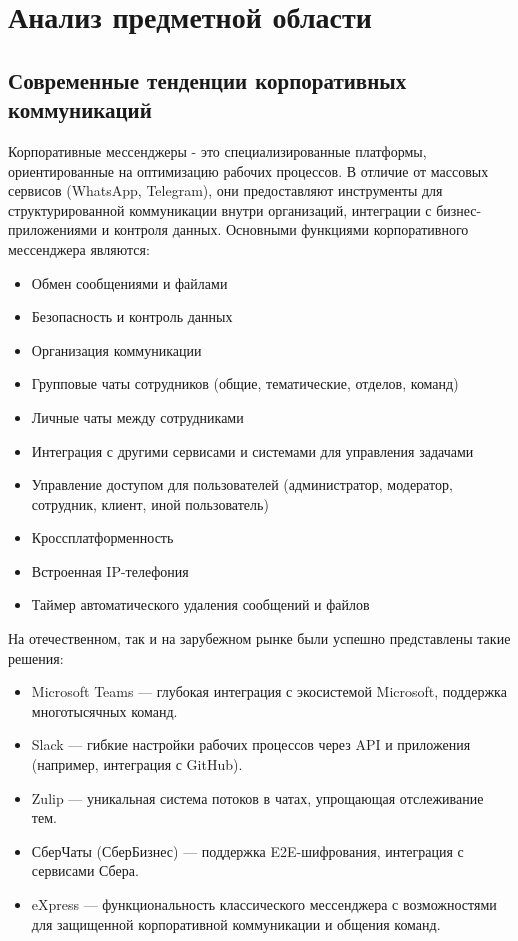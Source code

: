 \section{Анализ предметной области}
\subsection{Современные тенденции корпоративных коммуникаций}

Корпоративные мессенджеры - это специализированные платформы, ориентированные на оптимизацию рабочих процессов. В отличие от массовых сервисов (WhatsApp, Telegram), они предоставляют инструменты для структурированной коммуникации внутри организаций, интеграции с бизнес-приложениями и контроля данных.
Основными функциями корпоративного мессенджера являются:
\begin{itemize}
	\item Обмен сообщениями и файлами
	\item Безопасность и контроль данных
	\item Организация коммуникации
	\item Групповые чаты сотрудников (общие, тематические, отделов, команд)
	\item Личные чаты между сотрудниками
	\item Интеграция с другими сервисами и системами для управления задачами
	\item Управление доступом для пользователей (администратор, модератор, сотрудник, клиент, иной пользователь)
	\item Кроссплатформенность
	\item Встроенная IP-телефония
	\item Таймер автоматического удаления сообщений и файлов
\end{itemize}

На отечественном, так и на зарубежном рынке были успешно представлены такие решения:
\begin{itemize}
	\item Microsoft Teams — глубокая интеграция с экосистемой Microsoft, поддержка многотысячных команд.
	\item Slack — гибкие настройки рабочих процессов через API и приложения (например, интеграция с GitHub).
	\item Zulip — уникальная система потоков в чатах, упрощающая отслеживание тем.
	\item СберЧаты (СберБизнес) — поддержка E2E-шифрования, интеграция с сервисами Сбера.
	\item eXpress  — функциональность классического мессенджера с возможностями для защищенной корпоративной коммуникации и общения команд. 
\end{itemize}


